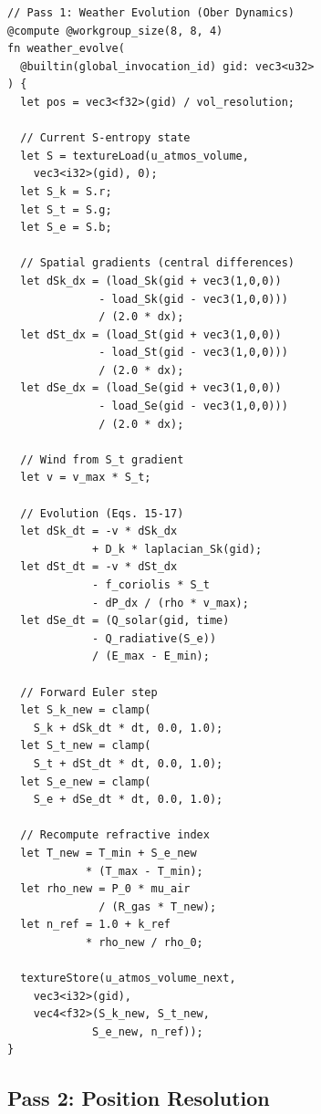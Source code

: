 \documentclass[10pt,twocolumn]{article}
\theoremstyle{definition}
\theoremstyle{remark}
\begin{document}
\begin{lstlisting}[style=wgsl,caption={Pass 1: Weather
  evolution via partition dynamics (compute shader).},
  label={lst:pass1}]
// Pass 1: Weather Evolution (Ober Dynamics)
@compute @workgroup_size(8, 8, 4)
fn weather_evolve(
  @builtin(global_invocation_id) gid: vec3<u32>
) {
  let pos = vec3<f32>(gid) / vol_resolution;

  // Current S-entropy state
  let S = textureLoad(u_atmos_volume,
    vec3<i32>(gid), 0);
  let S_k = S.r;
  let S_t = S.g;
  let S_e = S.b;

  // Spatial gradients (central differences)
  let dSk_dx = (load_Sk(gid + vec3(1,0,0))
              - load_Sk(gid - vec3(1,0,0)))
              / (2.0 * dx);
  let dSt_dx = (load_St(gid + vec3(1,0,0))
              - load_St(gid - vec3(1,0,0)))
              / (2.0 * dx);
  let dSe_dx = (load_Se(gid + vec3(1,0,0))
              - load_Se(gid - vec3(1,0,0)))
              / (2.0 * dx);

  // Wind from S_t gradient
  let v = v_max * S_t;

  // Evolution (Eqs. 15-17)
  let dSk_dt = -v * dSk_dx
             + D_k * laplacian_Sk(gid);
  let dSt_dt = -v * dSt_dx
             - f_coriolis * S_t
             - dP_dx / (rho * v_max);
  let dSe_dt = (Q_solar(gid, time)
             - Q_radiative(S_e))
             / (E_max - E_min);

  // Forward Euler step
  let S_k_new = clamp(
    S_k + dSk_dt * dt, 0.0, 1.0);
  let S_t_new = clamp(
    S_t + dSt_dt * dt, 0.0, 1.0);
  let S_e_new = clamp(
    S_e + dSe_dt * dt, 0.0, 1.0);

  // Recompute refractive index
  let T_new = T_min + S_e_new
            * (T_max - T_min);
  let rho_new = P_0 * mu_air
              / (R_gas * T_new);
  let n_ref = 1.0 + k_ref
            * rho_new / rho_0;

  textureStore(u_atmos_volume_next,
    vec3<i32>(gid),
    vec4<f32>(S_k_new, S_t_new,
             S_e_new, n_ref));
}
\end{lstlisting}

\subsection{Pass 2: Position Resolution}\label{sec:pass2}
\end{document}

